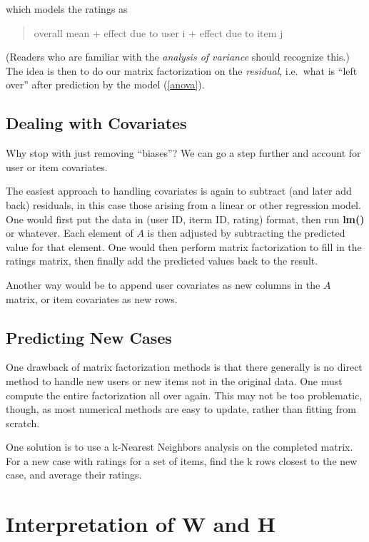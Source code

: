 which models the ratings as 

\begin{quote}

overall mean + effect due to user i + effect due to item j

\end{quote}

(Readers who are familiar with the \textit{analysis of variance}
should recognize this.)  The idea is then to do our matrix factorization
on the \textit{residual}, i.e.\ what is ``left over'' after prediction
by the model (\ref{anova}).

\subsection{Dealing with Covariates}

Why stop with just removing ``biases''?  We can go a step further and
account for user or item covariates.

The easiest approach to handling covariates is again to subtract (and
later add back) residuals, in this case those arising from a linear or
other regression model.  One would first put the data in (user ID, iterm
ID, rating) format, then run \textbf{lm()} or whatever.  Each element of
$A$ is then adjusted by subtracting the predicted value for that
element.  One would then perform matrix factorization to fill in the
ratings matrix, then finally add the predicted values back to the result.

Another way would be to append user covariates as new columns in the $A$
matrix, or item covariates as new rows.

\subsection{Predicting New Cases} 
\label{predictwh}

One drawback of matrix factorization methods is that there generally is
no direct method to handle new users or new items not in the original
data.  One must compute the entire factorization all over again.  This
may not be too problematic, though, as most numerical methods are easy to
update, rather than fitting from scratch.

One solution is to use a k-Nearest Neighbors analysis on the completed
matrix.  For a new case with ratings for a set of items, find the k rows
closest to the new case, and 
average their ratings.

\section{Interpretation of W and H}

